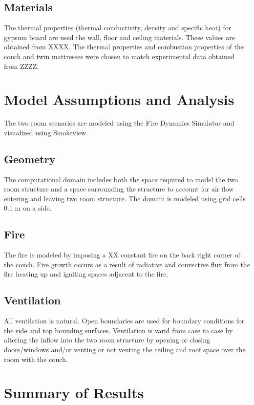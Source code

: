 \documentclass[11pt]{book}
\begin{document}
\subsection{Materials}
The thermal properties (thermal conductivity, density and specific heat) for gypsum board are used the wall, floor and ceiling materials.  These values are obtained from XXXX.  The thermal properties and combustion properties of the couch and twin mattresses were chosen to match experimental data obtained from ZZZZ.


\section{Model Assumptions and Analysis}
The two room scenarios are modeled using the Fire Dynamics Simulator and
visualized using Smokeview.

\subsection{Geometry}
The computational domain includes both the space required to model the two room
structure and a space surrounding the structure to account for air flow entering and leaving two room structure.  The domain is modeled using grid cells 0.1 m on a side.


\subsection{Fire}
The fire is modeled by imposing a XX constant fire on the back right corner of the
couch.  Fire growth occurs as a result of radiative and convective flux from the fire heating up and igniting spaces adjacent to the fire.

\subsection{Ventilation}
All ventilation is natural.  Open boundaries are used for boundary conditions for the side and top bounding surfaces.  Ventilation is varid from case to case by altering the inflow into the two room structure by opening or closing doors/windows and/or
venting or not venting the ceiling and roof space over the room with the couch.


\section{Summary of Results}
\end{document}
